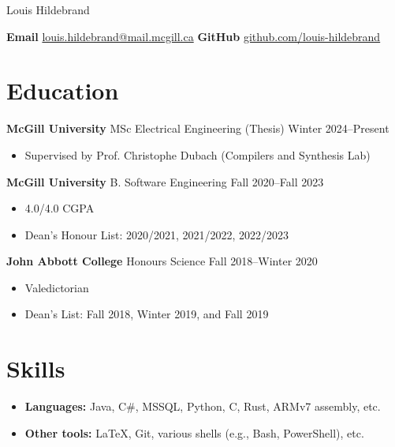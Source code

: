\documentclass[12pt]{article}
\begin{document}

\pagestyle{empty}

\begin{center}
	\Huge
	Louis Hildebrand
\end{center}
\vspace{0.5\baselineskip}

\textbf{Email}
\href{mailto:louis.hildebrand@mail.mcgill.ca}{louis.hildebrand@mail.mcgill.ca}
\hfill
\textbf{GitHub}
\href{https://github.com/louis-hildebrand}{github.com/louis-hildebrand}

\section*{Education}

\textbf{McGill University} MSc Electrical Engineering (Thesis)
\hfill
Winter 2024--Present
\begin{itemize}
	\item Supervised by Prof. Christophe Dubach (Compilers and Synthesis Lab)
\end{itemize}

\textbf{McGill University} B. Software Engineering
\hfill
Fall 2020--Fall 2023
\begin{itemize}
	\item 4.0/4.0 CGPA
	\item Dean's Honour List: 2020/2021, 2021/2022, 2022/2023
\end{itemize}

\textbf{John Abbott College} Honours Science
\hfill
Fall 2018--Winter 2020
\begin{itemize}
	\item Valedictorian
	\item Dean's List: Fall 2018, Winter 2019, and Fall 2019
\end{itemize}

\section*{Skills}

\begin{itemize}
	\item \textbf{Languages:} Java, C\#, MSSQL, Python, C, Rust, ARMv7 assembly, etc.
	\item \textbf{Other tools:} \LaTeX, Git, various shells (e.g., Bash, PowerShell), etc.
\end{itemize}
\end{document}
